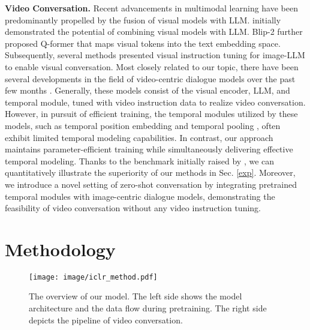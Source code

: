 \documentclass{article} \usepackage{iclr2024_conference,times}
\begin{document}
\noindent \textbf{Video Conversation.} 
Recent advancements in multimodal learning have been predominantly propelled by the fusion of visual models with LLM. \citet{yuan2021florence} initially demonstrated the potential of combining visual models with LLM. Blip-2 \citep{li2023blip} further proposed Q-former that maps visual tokens into the text embedding space. Subsequently, several methods presented visual instruction tuning \citep{liu2023visual,zhu2023minigpt,dai2023instructblip} for image-LLM to enable visual conversation. Most closely related to our topic, there have been several developments in the field of video-centric dialogue models over the past few months \citep{li2023videochat,zhang2023video,maaz2023video,luo2023valley}. 
Generally, these models consist of the visual encoder, LLM, and temporal module, tuned with video instruction data to realize video conversation. However, in pursuit of efficient training, the temporal modules utilized by these models, such as temporal position embedding \citep{zhang2023video} and temporal pooling \citep{maaz2023video,luo2023valley}, often exhibit limited temporal modeling capabilities. In contrast, our approach maintains parameter-efficient training while simultaneously delivering effective temporal modeling. Thanks to the benchmark initially raised by \citet{maaz2023video}, we can quantitatively illustrate the superiority of our methods in Sec. \ref{exp}. 
Moreover, we introduce a novel setting of zero-shot conversation by integrating pretrained temporal modules with image-centric dialogue models, demonstrating the feasibility of video conversation without any video instruction tuning. 

\vspace{-0.5em}

\section{Methodology} \label{method}

\vspace{-0.5em}

\begin{figure*}[t] 
\centering
    \texttt{[image: image/iclr\_method.pdf]} 
    \caption{The overview of our model. The left side shows the model architecture and the data flow during pretraining. The right side depicts the pipeline of video conversation.}
    \label{image_method}
    \vspace{-0.2em}
\end{figure*}
  
\end{document}
